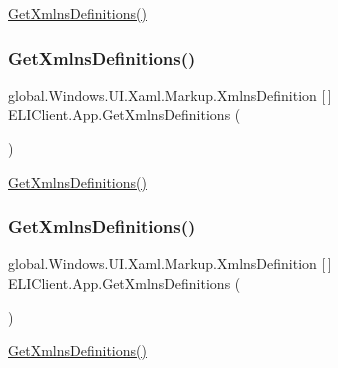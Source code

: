 \hyperlink{class_e_l_i_client_1_1_app_accf5e867fe29dd256be7c41a569315c6}{Get\+Xmlns\+Definitions()} 

\mbox{\label{class_e_l_i_client_1_1_app_accf5e867fe29dd256be7c41a569315c6}} 
\subsubsection{\texorpdfstring{Get\+Xmlns\+Definitions()}{GetXmlnsDefinitions()}\hspace{0.1cm}{\footnotesize\ttfamily [2/3]}}
{\footnotesize\ttfamily global.\+Windows.\+U\+I.\+Xaml.\+Markup.\+Xmlns\+Definition \mbox{[}$\,$\mbox{]} E\+L\+I\+Client.\+App.\+Get\+Xmlns\+Definitions (\begin{DoxyParamCaption}{ }\end{DoxyParamCaption})\hspace{0.3cm}{\ttfamily [inline]}}



\hyperlink{class_e_l_i_client_1_1_app_accf5e867fe29dd256be7c41a569315c6}{Get\+Xmlns\+Definitions()} 

\mbox{\label{class_e_l_i_client_1_1_app_accf5e867fe29dd256be7c41a569315c6}} 
\subsubsection{\texorpdfstring{Get\+Xmlns\+Definitions()}{GetXmlnsDefinitions()}\hspace{0.1cm}{\footnotesize\ttfamily [3/3]}}
{\footnotesize\ttfamily global.\+Windows.\+U\+I.\+Xaml.\+Markup.\+Xmlns\+Definition \mbox{[}$\,$\mbox{]} E\+L\+I\+Client.\+App.\+Get\+Xmlns\+Definitions (\begin{DoxyParamCaption}{ }\end{DoxyParamCaption})\hspace{0.3cm}{\ttfamily [inline]}}



\hyperlink{class_e_l_i_client_1_1_app_accf5e867fe29dd256be7c41a569315c6}{Get\+Xmlns\+Definitions()} 

